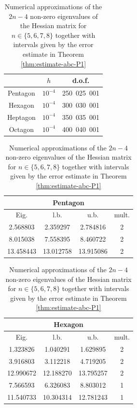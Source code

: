 \begin{table}[htb]
\smaller
\caption{Size of the computational problems for the finite element computations.}
\label{table:size-comp}
\begin{tabular}{|c|c|c|}
\hline
& $h$ & d.o.f. \\ \hline
Pentagon & $10^{-4}$ & 250\ 025\ 001\\ \hline
Hexagon & $10^{-4}$ & 300\ 030\ 001\\ \hline
Heptagon & $10^{-4}$ & 350\ 035\ 001\\ \hline
Octagon & $10^{-4}$ & 400\ 040\ 001\\ \hline
\end{tabular}

\vspace*{1.5\baselineskip}
\caption{Numerical approximations of the $2n-4$ non-zero eigenvalues of the Hessian matrix for $n\in \{5,6,7,8\}$ together with intervals given by the error estimate in Theorem \ref{thm:estimate-abc-P1}}
\label{tab:eig-bounds}
\raisebox{12.5pt}
{\begin{minipage}{.49\textwidth}
\begin{tabular}{|c|c|c|c|}
\hline
\multicolumn{4}{|c|}{Pentagon} \\
\hline
Eig. & l.b. & u.b. & mult. \\ \hline
2.568803 & 2.359297 & 2.784816 & 2\\ \hline
8.015038 & 7.558395 & 8.460722 & 2\\ \hline
13.458443 & 13.012758 & 13.915086 & 2\\ \hline
\end{tabular}
\end{minipage}}
\begin{minipage}{.49\textwidth}
\begin{tabular}{|c|c|c|c|}
\hline
\multicolumn{4}{|c|}{Hexagon} \\
\hline
Eig. & l.b. & u.b. & mult. \\ \hline
1.323826 & 1.040291 & 1.629895 & 2\\ \hline
3.916803 & 3.112218 & 4.719205 & 2\\ \hline
12.990672 & 12.188270 & 13.795257 & 2\\ \hline
7.566593 & 6.326083 & 8.803012 & 1 \\ \hline
11.540733 & 10.304314 & 12.781243 & 1 \\ \hline
\end{tabular}
\end{minipage}\par\medskip\noindent

\end{table}
